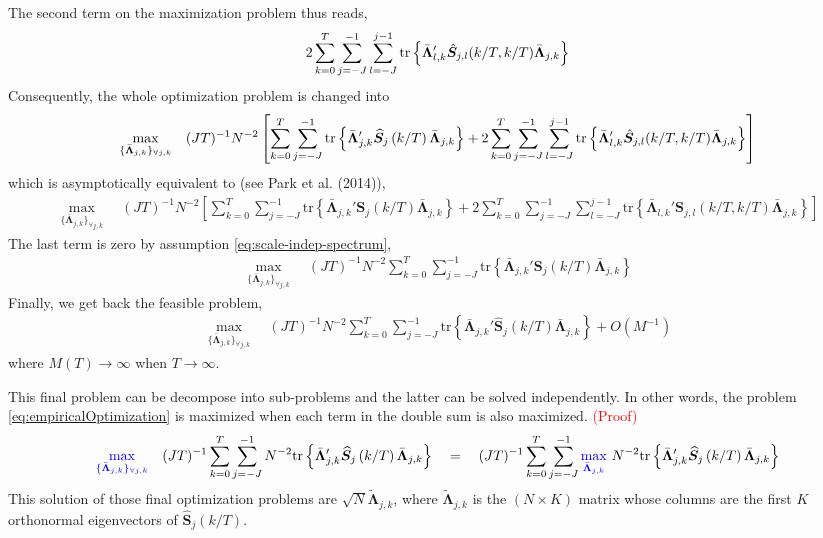 \documentclass{article}
\numberwithin{equation}{section}
\let \oldsum \sum
\renewcommand{\sum}{\displaystyle \oldsum}
\newcommand{\CEWS}[2]{\bm{S}_{#1}\left(#2/T\right)}
\newcommand{\scalesum}{\sum_{j=-J}^{-1}}
\newcommand{\locsum}{\sum_{k=0}^{T}}
\newcommand{\estimCEWS}[2]{\widehat{\bm{S}}_{#1}\left(#2/T\right)}
\newcommand{\optLoadings}[2]{\bar{\bm{\Lambda}}_{#1,#2}}
\newcommand{\setOptLoadings}{\{ \bar{\bm{\Lambda}}_{j,k} \}_{\forall j,k}}
\begin{document}
The second term on the maximization problem thus reads, 
\begin{align*}
	2 \locsum \scalesum \sum_{l=-J}^{j-1} \mathrm{tr} \left \{\optLoadings{l}{k}' \Hat{\bm{S}}_{j,l}(k/T, k/T) \optLoadings{j}{k} \right \}
\end{align*}
Consequently, the whole optimization problem is changed into
\begin{align*}
	\max_{\setOptLoadings} \quad (JT)^{-1}N^{-2} \left[ \locsum \scalesum \mathrm{tr} \left \{\optLoadings{j}{k}' \estimCEWS{j}{k} \optLoadings{j}{k} \right \} + 2 \locsum \scalesum \sum_{l=-J}^{j-1} \mathrm{tr} \left \{\optLoadings{l}{k}' \Hat{\bm{S}}_{j,l}(k/T, k/T) \optLoadings{j}{k} \right \} \right]
\end{align*}
which is asymptotically equivalent to (see Park et al. (2014)),
\begin{align*}
	\max_{\setOptLoadings} \quad (JT)^{-1}N^{-2} \left[ \locsum \scalesum \mathrm{tr} \left \{\optLoadings{j}{k}' \CEWS{j}{k} \optLoadings{j}{k} \right \} + 2 \locsum \scalesum \sum_{l=-J}^{j-1} \mathrm{tr} \left \{\optLoadings{l}{k}' \bm{S}_{j,l}(k/T, k/T) \optLoadings{j}{k} \right \} \right]
\end{align*}
The last term is zero by assumption \eqref{eq:scale-indep-spectrum}, 
\begin{align*}
	\max_{\setOptLoadings} \quad (JT)^{-1}N^{-2} \locsum \scalesum \mathrm{tr} \left \{\optLoadings{j}{k}' \CEWS{j}{k} \optLoadings{j}{k} \right \}
\end{align*}
Finally, we get back the feasible problem, 
\begin{align}\label{eq:empiricalOptimization}
	\max_{\setOptLoadings} \quad (JT)^{-1}N^{-2} \locsum \scalesum \mathrm{tr} \left \{\optLoadings{j}{k}' \estimCEWS{j}{k} \optLoadings{j}{k} \right \} + O(M^{-1})
\end{align}
where $M(T) \to \infty$ when $T \to \infty$.

This final problem can be decompose into sub-problems and the latter can be solved independently. In other words, the problem \eqref{eq:empiricalOptimization} is maximized when each term in the double sum is also maximized. \textcolor{red}{(Proof)}
\begin{align*}
	\textcolor{blue}{\max_{\setOptLoadings}} \quad (JT)^{-1} \locsum \scalesum N^{-2} \mathrm{tr} \left \{\optLoadings{j}{k}' \estimCEWS{j}{k} \optLoadings{j}{k} \right \} \quad = \quad (JT)^{-1} \locsum \scalesum \textcolor{blue}{\max_{\optLoadings{j}{k}}} \text{ } N^{-2} \mathrm{tr} \left \{\optLoadings{j}{k}' \estimCEWS{j}{k} \optLoadings{j}{k} \right \}
\end{align*}
This solution of those final optimization problems are $\sqrt{N}\bm{\tilde{\Lambda}}_{j,k}$, where $\bm{\tilde{\Lambda}}_{j,k}$ is the $(N \times K)$ matrix whose columns are the first $K$ orthonormal eigenvectors of $\estimCEWS{j}{k}$.\\
\end{document}
